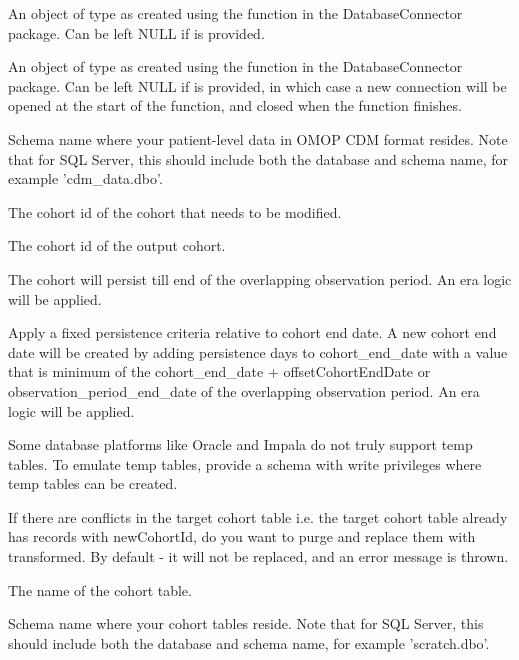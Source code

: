 \documentclass[a4paper]{book}
\begin{document}
\begin{Arguments}
\begin{ldescription}
\item[\code{connectionDetails}] An object of type  as created using the
 function in the
DatabaseConnector package. Can be left NULL if  is
provided.

\item[\code{connection}] An object of type  as created using the
 function in the
DatabaseConnector package. Can be left NULL if 
is provided, in which case a new connection will be opened at the start
of the function, and closed when the function finishes.

\item[\code{cdmDatabaseSchema}] Schema name where your patient-level data in OMOP CDM format resides.
Note that for SQL Server, this should include both the database and
schema name, for example 'cdm\_data.dbo'.

\item[\code{oldCohortId}] The cohort id of the cohort that needs to be modified.

\item[\code{newCohortId}] The cohort id of the output cohort.

\item[\code{tillEndOfObservationPeriod}] The cohort will persist till end of the overlapping observation period. An era logic
will be applied.

\item[\code{offsetCohortStartDate}] 

\item[\code{offsetCohortEndDate}] Apply a fixed persistence criteria relative to cohort end date. A new cohort
end date will be created by adding persistence days to cohort\_end\_date with a
value that is minimum of the cohort\_end\_date + offsetCohortEndDate
or observation\_period\_end\_date of the overlapping observation period. An era logic
will be applied.

\item[\code{tempEmulationSchema}] Some database platforms like Oracle and Impala do not truly support
temp tables. To emulate temp tables, provide a schema with write
privileges where temp tables can be created.

\item[\code{purgeConflicts}] If there are conflicts in the target cohort table i.e. the target cohort table
already has records with newCohortId, do you want to purge and replace them
with transformed. By default - it will not be replaced, and an error message is thrown.

\item[\code{cohortTable}] The name of the cohort table.

\item[\code{cohortDatabaseSchema}] Schema name where your cohort tables reside. Note that for SQL Server,
this should include both the database and schema name, for example
'scratch.dbo'.
\end{ldescription}
\end{Arguments}
\end{document}

